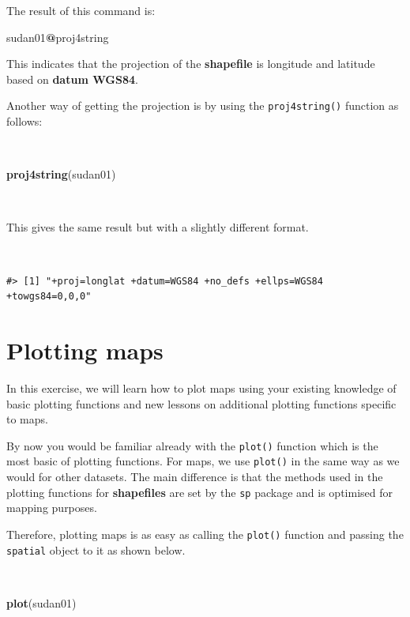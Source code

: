 \documentclass[12pt,a4paper,a4paper]{book}
\newenvironment{Shaded}{\begin{snugshade}}{\end{snugshade}}
\newcommand{\KeywordTok}[1]{\textcolor[rgb]{0.13,0.29,0.53}{\textbf{#1}}}
\newcommand{\OperatorTok}[1]{\textcolor[rgb]{0.81,0.36,0.00}{\textbf{#1}}}
\newcommand{\NormalTok}[1]{#1}
\theoremstyle{definition}
\theoremstyle{definition}
\theoremstyle{definition}
\theoremstyle{remark}
\begin{document}
The result of this command is:

\begin{Shaded}
\begin{Highlighting}[]
\NormalTok{sudan01}\OperatorTok{@}\NormalTok{proj4string}
\end{Highlighting}
\end{Shaded}

This indicates that the projection of the \textbf{shapefile} is
longitude and latitude based on \textbf{datum WGS84}.

Another way of getting the projection is by using the
\texttt{proj4string()} function as follows:

~

\begin{Shaded}
\begin{Highlighting}[]
\KeywordTok{proj4string}\NormalTok{(sudan01)}
\end{Highlighting}
\end{Shaded}

~

This gives the same result but with a slightly different format.

~

\begin{verbatim}
#> [1] "+proj=longlat +datum=WGS84 +no_defs +ellps=WGS84 +towgs84=0,0,0"
\end{verbatim}

\hypertarget{exercise2}{%
\chapter{Plotting maps}\label{exercise2}}

In this exercise, we will learn how to plot maps using your existing
knowledge of basic plotting functions and new lessons on additional
plotting functions specific to maps.

By now you would be familiar already with the \texttt{plot()} function
which is the most basic of plotting functions. For maps, we use
\texttt{plot()} in the same way as we would for other datasets. The main
difference is that the methods used in the plotting functions for
\textbf{shapefiles} are set by the \texttt{sp} package and is optimised
for mapping purposes.

Therefore, plotting maps is as easy as calling the \texttt{plot()}
function and passing the \texttt{spatial} object to it as shown below.

~

\begin{Shaded}
\begin{Highlighting}[]
\KeywordTok{plot}\NormalTok{(sudan01)}
\end{Highlighting}
\end{Shaded}
\end{document}
